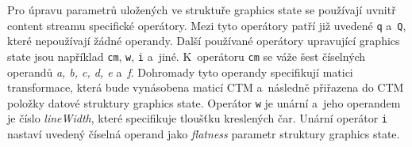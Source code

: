 Pro úpravu parametrů uložených ve struktuře graphics state se používají uvnitř
content streamu specifické operátory. Mezi tyto operátory patří již uvedené
\texttt{q} a~\texttt{Q}, které nepoužívají žádné operandy. Další používané
operátory upravující graphics state jsou například \texttt{cm}, \texttt{w},
\texttt{i} a~jiné. K~operátoru \texttt{cm} se váže šest číselných operandů
\emph{a, b, c, d, e} a~\emph{f}. Dohromady tyto operandy specifikují matici
transformace, která bude vynásobena maticí CTM a~následně přiřazena do CTM položky
datové struktury graphics state. Operátor \texttt{w} je unární a~jeho operandem
je číslo \emph{lineWidth}, které specifikuje tloušťku kreslených čar. Unární
operátor \texttt{i} nastaví uvedený číselná operand jako \emph{flatness} parametr
struktury graphics state.



